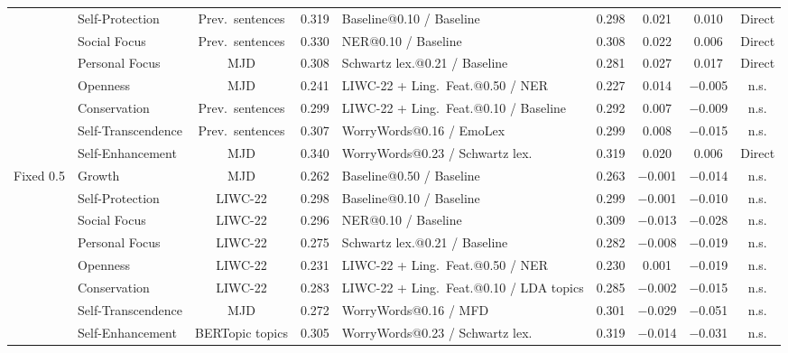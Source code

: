 \begin{table}[!htbp]
\begin{tabularx}{\textwidth}{llccXcccc}
 & Self-Protection & Prev.\ sentences & 0.319 & Baseline@0.10 / Baseline & 0.298 & 0.021 & 0.010 & Direct \\
 & Social Focus & Prev.\ sentences & 0.330 & NER@0.10 / Baseline & 0.308 & 0.022 & 0.006 & Direct \\
 & Personal Focus & MJD & 0.308 & Schwartz lex.@0.21 / Baseline & 0.281 & 0.027 & 0.017 & Direct \\
 & Openness & MJD & 0.241 & LIWC-22 + Ling.\ Feat.@0.50 / NER & 0.227 & 0.014 & $-$0.005 & n.s. \\
 & Conservation & Prev.\ sentences & 0.299 & LIWC-22 + Ling.\ Feat.@0.10 / Baseline & 0.292 & 0.007 & $-$0.009 & n.s. \\
 & Self-Transcendence & Prev.\ sentences & 0.307 & WorryWords@0.16 / EmoLex & 0.299 & 0.008 & $-$0.015 & n.s. \\
 & Self-Enhancement & MJD & 0.340 & WorryWords@0.23 / Schwartz lex. & 0.319 & 0.020 & 0.006 & Direct \\
Fixed 0.5 & Growth & MJD & 0.262 & Baseline@0.50 / Baseline & 0.263 & $-$0.001 & $-$0.014 & n.s. \\
 & Self-Protection & LIWC-22 & 0.298 & Baseline@0.10 / Baseline & 0.299 & $-$0.001 & $-$0.010 & n.s. \\
 & Social Focus & LIWC-22 & 0.296 & NER@0.10 / Baseline & 0.309 & $-$0.013 & $-$0.028 & n.s. \\
 & Personal Focus & LIWC-22 & 0.275 & Schwartz lex.@0.21 / Baseline & 0.282 & $-$0.008 & $-$0.019 & n.s. \\
 & Openness & LIWC-22 & 0.231 & LIWC-22 + Ling.\ Feat.@0.50 / NER & 0.230 & 0.001 & $-$0.019 & n.s. \\
 & Conservation & LIWC-22 & 0.283 & LIWC-22 + Ling.\ Feat.@0.10 / LDA topics & 0.285 & $-$0.002 & $-$0.015 & n.s. \\
 & Self-Transcendence & MJD & 0.272 & WorryWords@0.16 / MFD & 0.301 & $-$0.029 & $-$0.051 & n.s. \\
 & Self-Enhancement & BERTopic topics & 0.305 & WorryWords@0.23 / Schwartz lex. & 0.319 & $-$0.014 & $-$0.031 & n.s. \\
\hline
\end{tabularx}
\end{table}

